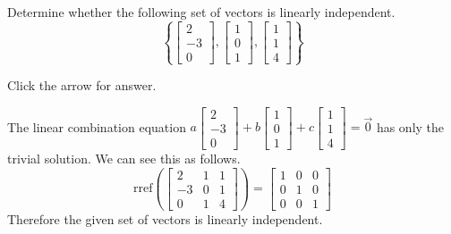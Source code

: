\documentclass{ximera}
\begin{document}
\begin{problem}\label{prb:sovedCh2_1}
Determine whether the following set of vectors is linearly independent.
$$\left\{\begin{bmatrix}
    2\\ -3\\0
\end{bmatrix}, \begin{bmatrix}
    1\\0\\1
\end{bmatrix}, \begin{bmatrix}
    1\\1\\4
\end{bmatrix}\right\}$$

Click the arrow for answer.

\begin{expandable}
    The linear combination equation $a\begin{bmatrix}
    2\\ -3\\0
\end{bmatrix}+ b\begin{bmatrix}
    1\\0\\1
\end{bmatrix}+ c\begin{bmatrix}
    1\\1\\4
\end{bmatrix}=\vec{0}$ has only the trivial solution.  We can see this as follows.
$$\text{rref}\left(\begin{bmatrix}2 & 1 & 1\\-3 & 0 & 1\\0 & 1 & 4\end{bmatrix}\right)=\begin{bmatrix}
    1 & 0 & 0\\0 & 1 &0\\ 0 & 0 &1
\end{bmatrix}$$
Therefore the given set of vectors is linearly independent.
\end{expandable}
\end{problem}
\end{document}
